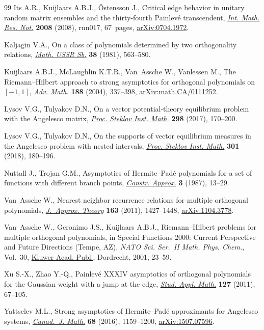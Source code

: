 \begin{thebibliography}{99}
Its A.R., Kuijlaars A.B.J., \"Ostensson J., Critical edge behavior in unitary
 random matrix ensembles and the thirty-fourth {P}ainlev\'e transcendent,
 \href{https://doi.org/10.1093/imrn/rnn017}{\textit{Int. Math. Res. Not.}}
 \textbf{2008} (2008), rnn017, 67~pages, \href{http://arxiv.org/abs/0704.1972}{arXiv:0704.1972}.

Kaljagin V.A., On a class of polynomials determined by two orthogonality
 relations,
 \href{https://doi.org/10.1070/SM1981v038n04ABEH001465}{\textit{Math. USSR
 Sb.}} \textbf{38} (1981), 563--580.

Kuijlaars A.B.J., McLaughlin K.T.R., Van~Assche W., Vanlessen M., The
 {R}iemann--{H}ilbert approach to strong asymptotics for orthogonal
 polynomials on~{$[-1,1]$},
 \href{https://doi.org/10.1016/j.aim.2003.08.015}{\textit{Adv. Math.}}
 \textbf{188} (2004), 337--398, \href{http://arxiv.org/abs/math.CA/0111252}{arXiv:math.CA/0111252}.

Lysov V.G., Tulyakov D.N., On a vector potential-theory equilibrium problem
 with the {A}ngelesco matrix,
 \href{https://doi.org/10.1134/s008154381706013x}{\textit{Proc. Steklov Inst.
 Math.}} \textbf{298} (2017), 170--200.

Lysov V.G., Tulyakov D.N., On the supports of vector equilibrium measures in
 the {A}ngelesco problem with nested intervals,
 \href{https://doi.org/10.1134/S0081543818040144}{\textit{Proc. Steklov Inst.
 Math.}} \textbf{301} (2018), 180--196.

Nuttall J., Trojan G.M., Asymptotics of {H}ermite--{P}ad\'e polynomials for a
 set of functions with different branch points,
 \href{https://doi.org/10.1007/BF01890550}{\textit{Constr. Approx.}}
 \textbf{3} (1987), 13--29.

Van~Assche W., Nearest neighbor recurrence relations for multiple orthogonal
 polynomials,
 \href{https://doi.org/10.1016/j.jat.2011.05.003}{\textit{J.~Approx. Theory}}
 \textbf{163} (2011), 1427--1448, \href{http://arxiv.org/abs/1104.3778}{arXiv:1104.3778}.

Van~Assche W., Geronimo J.S., Kuijlaars A.B.J., Riemann--{H}ilbert problems for
 multiple orthogonal polynomials, in Special {F}unctions 2000: {C}urrent
 {P}erspective and {F}uture {D}irections ({T}empe, {AZ}), \textit{NATO Sci.
 Ser.~II Math. Phys. Chem.}, Vol.~30,
 \href{https://doi.org/10.1007/978-94-010-0818-1_2}{Kluwer Acad. Publ.},
 Dordrecht, 2001, 23--59.

Xu S.-X., Zhao Y.-Q., Painlev\'e {XXXIV} asymptotics of orthogonal polynomials
 for the {G}aussian weight with a jump at the edge,
 \href{https://doi.org/10.1111/j.1467-9590.2010.00512.x}{\textit{Stud. Appl.
 Math.}} \textbf{127} (2011), 67--105.

Yattselev M.L., Strong asymptotics of {H}ermite--{P}ad\'e approximants for
 {A}ngelesco systems,
 \href{https://doi.org/10.4153/CJM-2015-043-3}{\textit{Canad.~J. Math.}}
 \textbf{68} (2016), 1159--1200, \href{http://arxiv.org/abs/1507.07596}{arXiv:1507.07596}.

\end{thebibliography}
